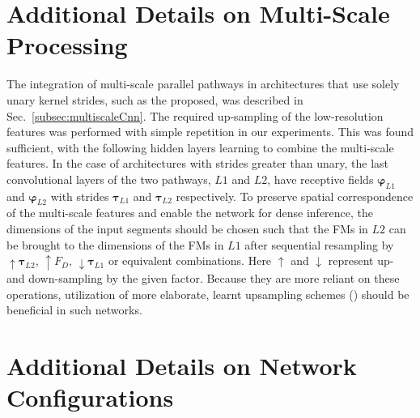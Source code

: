 
\appendix


\section{Additional Details on Multi-Scale Processing}
\label{app:detailsMultiscale}

The integration of multi-scale parallel pathways in architectures that use solely unary kernel strides, such as the proposed, was described in Sec.~\ref{subsec:multiscaleCnn}. The required up-sampling of the low-resolution features was performed with simple repetition in our experiments. This was found sufficient, with the following hidden layers learning to combine the multi-scale features. In the case of architectures with strides greater than unary, the last convolutional layers of the two pathways, $L1$ and $L2$, have receptive fields $\boldsymbol{\varphi}_{L1}$ and $\boldsymbol{\varphi}_{L2}$ with strides $\boldsymbol{\tau}_{L1}$ and $\boldsymbol{\tau}_{L2}$ respectively. To preserve spatial correspondence of the multi-scale features and enable the network for dense inference, the dimensions of the input segments should be chosen such that the FMs in $L2$ can be brought to the dimensions of the FMs in $L1$ after sequential resampling by $\uparrow \boldsymbol{\tau}_{L2}$, $\uparrow F_D$, $\downarrow \boldsymbol{\tau}_{L1}$ or equivalent combinations. Here $\uparrow$ and $\downarrow$ represent up- and down-sampling by the given factor. Because they are more reliant on these operations, utilization of more elaborate, learnt upsampling schemes (\cite{Long2014, Ronneberger2015, Noh2015}) should be beneficial in such networks.


\section{Additional Details on Network Configurations}
\label{app:detailsConfig}

